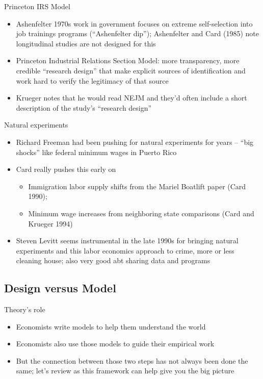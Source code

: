 \documentclass{beamer}
\begin{document}
\begin{frame}{Princeton IRS Model}

\begin{itemize}
\item Ashenfelter 1970s work in government focuses on extreme self-selection into job trainings programs (``Ashenfelter dip''); Ashenfelter and Card (1985) note longitudinal studies are not designed for this 
\item Princeton Industrial Relations Section Model: more transparency, more credible ``research design'' that make explicit sources of identification and work hard to verify the legitimacy of that source
\item Krueger notes that he would read NEJM and they'd often include a short description of the study's ``research design''
\end{itemize}

\end{frame}

\begin{frame}{Natural experiments}

\begin{itemize}
\item Richard Freeman had been pushing for natural experiments for years -- ``big shocks'' like federal minimum wages in Puerto Rico
\item Card really pushes this early on 
	\begin{itemize}
	\item Immigration labor supply shifts from the Mariel Boatlift paper (Card 1990); 
	\item Minimum wage increases from neighboring state comparisons (Card and Krueger 1994)
	\end{itemize}
\item Steven Levitt seems instrumental in the late 1990s for bringing natural experiments and this labor economics approach to crime, more or less cleaning house; also very good abt sharing data and programs
\end{itemize}

\end{frame}


\subsection{Design versus Model}

\begin{frame}{Theory's role}

\begin{itemize}
\item Economists write models to help them understand the world
\item Economists also use those models to guide their empirical work
\item But the connection between those two steps has not always been done the same; let's review as this framework can help give you the big picture
\end{itemize}

\end{frame}
\end{document}
